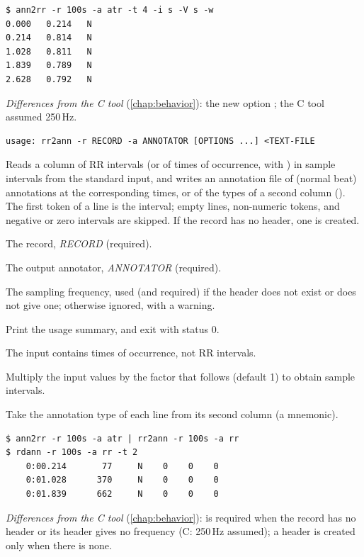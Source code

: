 \begin{lstlisting}[style=text]
$ ann2rr -r 100s -a atr -t 4 -i s -V s -w
0.000   0.214   N
0.214   0.814   N
1.028   0.811   N
1.839   0.789   N
2.628   0.792   N
\end{lstlisting}
\textit{Differences from the C tool} (\cref{chap:behavior}): the new option ; the C
tool assumed 250\,Hz.

\begin{lstlisting}[style=signature,language={}]
usage: rr2ann -r RECORD -a ANNOTATOR [OPTIONS ...] <TEXT-FILE
\end{lstlisting}
Reads a column of RR intervals (or of times of occurrence, with ) in sample
intervals from the standard input, and writes an annotation file of  (normal beat)
annotations at the corresponding times, or of the types of a second column (). The
first token of a line is the interval; empty lines, non-numeric tokens, and negative or zero
intervals are skipped. If the record has no header, one is created.
\begin{params}
\item[-r] The record, \textit{RECORD} (required).
\item[-a] The output annotator, \textit{ANNOTATOR} (required).
\item[-F] The sampling frequency, used (and required) if the header does not exist or does
  not give one; otherwise ignored, with a warning.
\item[-h] Print the usage summary, and exit with status 0.
\item[-T] The input contains times of occurrence, not RR intervals.
\item[-x] Multiply the input values by the factor that follows (default 1) to obtain sample
  intervals.
\item[-w] Take the annotation type of each line from its second column (a mnemonic).
\end{params}
\begin{lstlisting}[style=text]
$ ann2rr -r 100s -a atr | rr2ann -r 100s -a rr
$ rdann -r 100s -a rr -t 2
    0:00.214       77     N    0    0    0
    0:01.028      370     N    0    0    0
    0:01.839      662     N    0    0    0
\end{lstlisting}
\textit{Differences from the C tool} (\cref{chap:behavior}):  is required when the
record has no header or its header gives no frequency (C: 250\,Hz assumed); a header is
created only when there is none.

